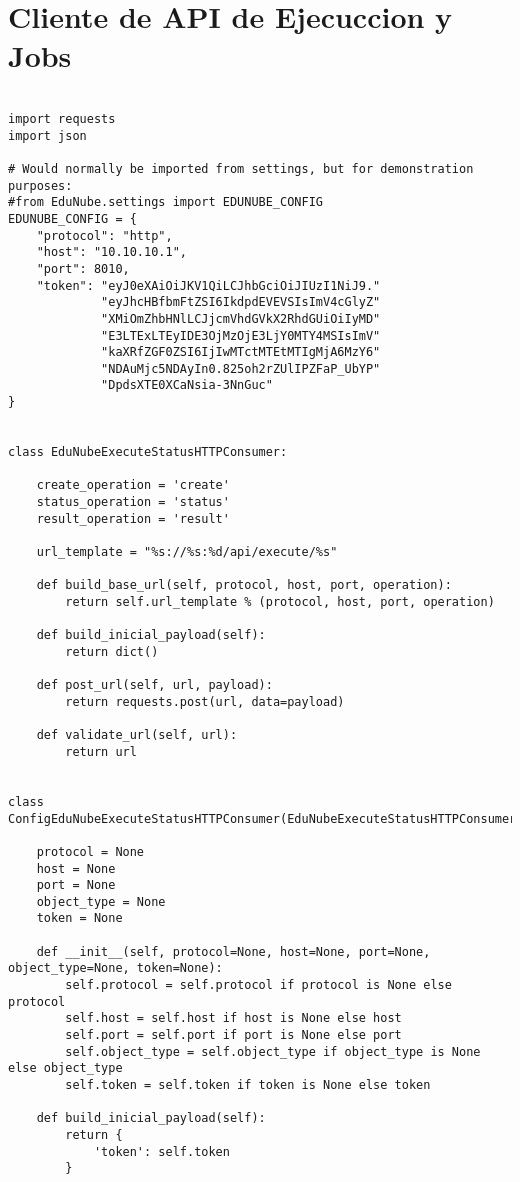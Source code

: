 \section{Cliente de API de Ejecuccion y Jobs}
\lstset{language=Python}
\begin{lstlisting}[breaklines]

import requests
import json

# Would normally be imported from settings, but for demonstration purposes:
#from EduNube.settings import EDUNUBE_CONFIG
EDUNUBE_CONFIG = {
    "protocol": "http",
    "host": "10.10.10.1",
    "port": 8010,
    "token": "eyJ0eXAiOiJKV1QiLCJhbGciOiJIUzI1NiJ9."
             "eyJhcHBfbmFtZSI6IkdpdEVEVSIsImV4cGlyZ"
             "XMiOmZhbHNlLCJjcmVhdGVkX2RhdGUiOiIyMD"
             "E3LTExLTEyIDE3OjMzOjE3LjY0MTY4MSIsImV"
             "kaXRfZGF0ZSI6IjIwMTctMTEtMTIgMjA6MzY6"
             "NDAuMjc5NDAyIn0.825oh2rZUlIPZFaP_UbYP"
             "DpdsXTE0XCaNsia-3NnGuc"
}


class EduNubeExecuteStatusHTTPConsumer:

    create_operation = 'create'
    status_operation = 'status'
    result_operation = 'result'

    url_template = "%s://%s:%d/api/execute/%s"

    def build_base_url(self, protocol, host, port, operation):
        return self.url_template % (protocol, host, port, operation)

    def build_inicial_payload(self):
        return dict()

    def post_url(self, url, payload):
        return requests.post(url, data=payload)

    def validate_url(self, url):
        return url


class ConfigEduNubeExecuteStatusHTTPConsumer(EduNubeExecuteStatusHTTPConsumer):

    protocol = None
    host = None
    port = None
    object_type = None
    token = None

    def __init__(self, protocol=None, host=None, port=None, object_type=None, token=None):
        self.protocol = self.protocol if protocol is None else protocol
        self.host = self.host if host is None else host
        self.port = self.port if port is None else port
        self.object_type = self.object_type if object_type is None else object_type
        self.token = self.token if token is None else token

    def build_inicial_payload(self):
        return {
            'token': self.token
        }


\end{lstlisting}
